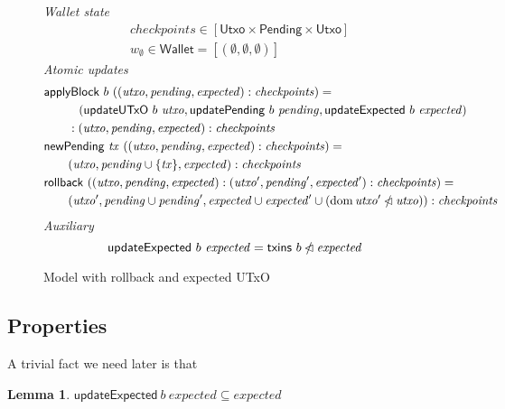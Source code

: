 \documentclass{article}
\newcommand{\restrictdom}{\lhd}
\newcommand{\subtractdom}{\mathbin{\slashed{\restrictdom}}}
\DeclareMathOperator{\dom}{dom}
\newtheorem{lemma}{Lemma}[section] %
\numberwithin{equation}{lemma}
\begin{document}
\begin{figure}
%
\emph{Wallet state}
%
\begin{align*}
& \mathit{checkpoints} \in [\mathsf{Utxo} \times \mathsf{Pending} \times \mathsf{Utxo}] \\
& w_\emptyset \in \mathsf{Wallet} = [(\emptyset, \emptyset, \emptyset)]
\end{align*}
%
\emph{Atomic updates}
%
\begin{align*}
& \mathsf{applyBlock} ~ b ~ ((\mathit{utxo}, \mathit{pending}, \mathit{expected}) : \mathit{checkpoints}) = \\
& \qquad \phantom{:{}} ~ (\mathsf{updateUTxO} ~ b ~ \mathit{utxo}, \mathsf{updatePending} ~ b ~ \mathit{pending}, \mathsf{updateExpected} ~ b ~ \mathit{expected}) \\
& \qquad : (\mathit{utxo}, \mathit{pending}, \mathit{expected}) : \mathit{checkpoints} \\
& \mathsf{newPending} ~ \mathit{tx} ~ ((\mathit{utxo}, \mathit{pending}, \mathit{expected}) : \mathit{checkpoints}) = \\
& \qquad (\mathit{utxo}, \mathit{pending} \cup \{\mathit{tx}\}, \mathit{expected}) : \mathit{checkpoints} \\
& \mathsf{rollback} ~ ((\mathit{utxo}, \mathit{pending}, \mathit{expected}) : (\mathit{utxo}', \mathit{pending}', \mathit{expected}') : \mathit{checkpoints}) = \\
& \qquad (\mathit{utxo}', \mathit{pending} \cup \mathit{pending}', \mathit{expected} \cup \mathit{expected}' \cup (\dom \mathit{utxo}' \subtractdom \mathit{utxo})) : \mathit{checkpoints} \\
\end{align*}
%
\emph{Auxiliary}
%
\begin{equation*}
\mathsf{updateExpected} ~ b ~ \mathit{expected} = \mathsf{txins} ~ b \subtractdom \mathit{expected}
\end{equation*}
%
\caption{\label{fig:model_with_expected_UTxO}Model with rollback and expected UTxO}
\end{figure}

\subsection{Properties}

A trivial fact we need later is that
%
\begin{lemma} \label{lem:updateExpected_is_filter}
\begin{math}
\mathsf{updateExpected} ~ b ~ \mathit{expected} \subseteq \mathit{expected}
\end{math}
\end{lemma}
\end{document}
